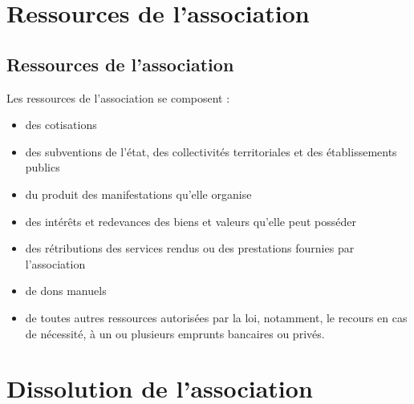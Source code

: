 \documentclass[a4paper,french,10pt]{article}
\begin{document}





\section{Ressources de l’association}

\subsection{Ressources de l’association}
\label{sec:ressources}
Les ressources de l’association se composent :
\begin{itemize}
\item des cotisations
  
\item des subventions de l’état, des collectivités territoriales et
des établissements publics

\item du produit des manifestations qu’elle organise

\item des intérêts et redevances des biens et valeurs qu’elle peut
posséder

\item des rétributions des services rendus ou des prestations fournies
par l'association

\item de dons manuels

\item de toutes autres ressources autorisées par la loi, notamment, le
recours en cas de nécessité, à un ou plusieurs emprunts bancaires ou
privés.
\end{itemize}


\section{Dissolution de l’association}
\end{document}
